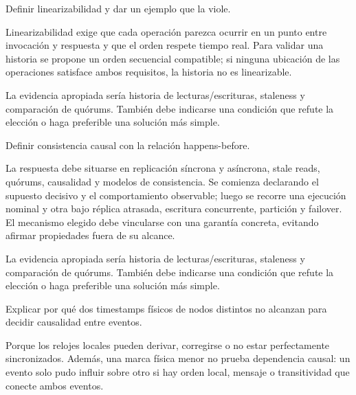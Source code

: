 \documentclass[variant=guia,cover=institutional,mode=screen]{ua-engineering-v6-article}
\begin{document}
\begin{uaexercise}
Definir linearizabilidad y dar un ejemplo que la viole.
\end{uaexercise}
\begin{uaanswer}
Linearizabilidad exige que cada operación parezca ocurrir en un punto entre invocación y respuesta y que el orden respete tiempo real. Para validar una historia se propone un orden secuencial compatible; si ninguna ubicación de las operaciones satisface ambos requisitos, la historia no es linearizable.

La evidencia apropiada sería historia de lecturas/escrituras, staleness y comparación de quórums. También debe indicarse una condición que refute la elección o haga preferible una solución más simple.
\end{uaanswer}

\begin{uaexercise}
Definir consistencia causal con la relación happens-before.
\end{uaexercise}
\begin{uaanswer}
La respuesta debe situarse en replicación síncrona y asíncrona, stale reads, quórums, causalidad y modelos de consistencia. Se comienza declarando el supuesto decisivo y el comportamiento observable; luego se recorre una ejecución nominal y otra bajo réplica atrasada, escritura concurrente, partición y failover. El mecanismo elegido debe vincularse con una garantía concreta, evitando afirmar propiedades fuera de su alcance.

La evidencia apropiada sería historia de lecturas/escrituras, staleness y comparación de quórums. También debe indicarse una condición que refute la elección o haga preferible una solución más simple.
\end{uaanswer}

\begin{uaexercise}
Explicar por qué dos timestamps físicos de nodos distintos no alcanzan para decidir causalidad entre eventos.
\end{uaexercise}
\begin{uaanswer}
Porque los relojes locales pueden derivar, corregirse o no estar perfectamente sincronizados. Además, una marca física menor no prueba dependencia causal: un evento solo pudo influir sobre otro si hay orden local, mensaje o transitividad que conecte ambos eventos.
\end{uaanswer}
\end{document}
